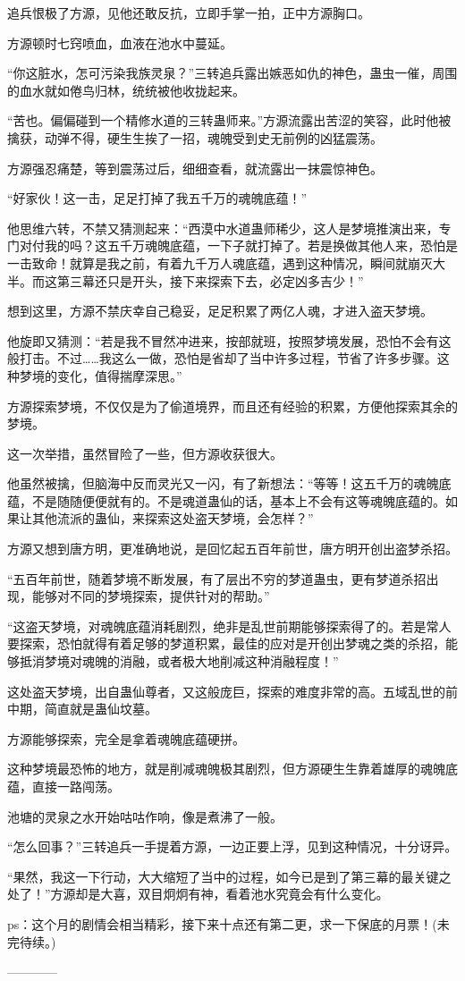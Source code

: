 \begin{this_body}
追兵恨极了方源，见他还敢反抗，立即手掌一拍，正中方源胸口。

方源顿时七窍喷血，血液在池水中蔓延。

“你这脏水，怎可污染我族灵泉？”三转追兵露出嫉恶如仇的神色，蛊虫一催，周围的血水就如倦鸟归林，统统被他收拢起来。

“苦也。偏偏碰到一个精修水道的三转蛊师来。”方源流露出苦涩的笑容，此时他被擒获，动弹不得，硬生生挨了一招，魂魄受到史无前例的凶猛震荡。

方源强忍痛楚，等到震荡过后，细细查看，就流露出一抹震惊神色。

“好家伙！这一击，足足打掉了我五千万的魂魄底蕴！”

他思维六转，不禁又猜测起来：“西漠中水道蛊师稀少，这人是梦境推演出来，专门对付我的吗？这五千万魂魄底蕴，一下子就打掉了。若是换做其他人来，恐怕是一击致命！就算是我之前，有着九千万人魂底蕴，遇到这种情况，瞬间就崩灭大半。而这第三幕还只是开头，接下来探索下去，必定凶多吉少！”

想到这里，方源不禁庆幸自己稳妥，足足积累了两亿人魂，才进入盗天梦境。

他旋即又猜测：“若是我不冒然冲进来，按部就班，按照梦境发展，恐怕不会有这般打击。不过……我这么一做，恐怕是省却了当中许多过程，节省了许多步骤。这种梦境的变化，值得揣摩深思。”

方源探索梦境，不仅仅是为了偷道境界，而且还有经验的积累，方便他探索其余的梦境。

这一次举措，虽然冒险了一些，但方源收获很大。

他虽然被擒，但脑海中反而灵光又一闪，有了新想法：“等等！这五千万的魂魄底蕴，不是随随便便就有的。不是魂道蛊仙的话，基本上不会有这等魂魄底蕴的。如果让其他流派的蛊仙，来探索这处盗天梦境，会怎样？”

方源又想到唐方明，更准确地说，是回忆起五百年前世，唐方明开创出盗梦杀招。

“五百年前世，随着梦境不断发展，有了层出不穷的梦道蛊虫，更有梦道杀招出现，能够对不同的梦境探索，提供针对的帮助。”

“这盗天梦境，对魂魄底蕴消耗剧烈，绝非是乱世前期能够探索得了的。若是常人要探索，恐怕就得有着足够的梦道积累，最佳的应对是开创出梦魂之类的杀招，能够抵消梦境对魂魄的消融，或者极大地削减这种消融程度！”

这处盗天梦境，出自蛊仙尊者，又这般庞巨，探索的难度非常的高。五域乱世的前中期，简直就是蛊仙坟墓。

方源能够探索，完全是拿着魂魄底蕴硬拼。

这种梦境最恐怖的地方，就是削减魂魄极其剧烈，但方源硬生生靠着雄厚的魂魄底蕴，直接一路闯荡。

池塘的灵泉之水开始咕咕作响，像是煮沸了一般。

“怎么回事？”三转追兵一手提着方源，一边正要上浮，见到这种情况，十分讶异。

“果然，我这一下行动，大大缩短了当中的过程，如今已是到了第三幕的最关键之处了！”方源却是大喜，双目炯炯有神，看着池水究竟会有什么变化。

ps：这个月的剧情会相当精彩，接下来十点还有第二更，求一下保底的月票！(未完待续。)

------------

\end{this_body}

